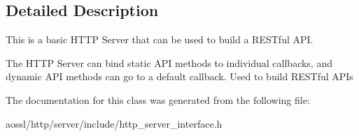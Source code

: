 \subsection{Detailed Description}
This is a basic H\+T\+TP Server that can be used to build a R\+E\+S\+Tful A\+PI. 

The H\+T\+TP Server can bind static A\+PI methods to individual callbacks, and dynamic A\+PI methods can go to a default callback. Used to build R\+E\+S\+Tful A\+PI\textquotesingle{}s 

The documentation for this class was generated from the following file\+:\begin{DoxyCompactItemize}
\item 
aossl/http/server/include/http\+\_\+server\+\_\+interface.\+h\end{DoxyCompactItemize}
